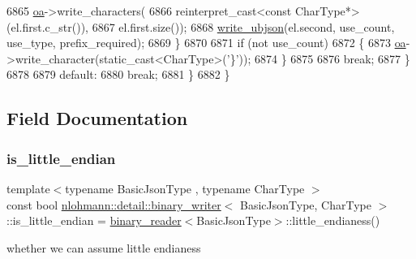 \begin{DoxyCode}
6865                     \hyperlink{classnlohmann_1_1detail_1_1binary__writer_a6f15b782a7900f50ef37d123008e601b}{oa}->write\_characters(
6866                         reinterpret\_cast<const CharType*>(el.first.c\_str()),
6867                         el.first.size());
6868                     \hyperlink{classnlohmann_1_1detail_1_1binary__writer_a0f6c65053d859269f88eb4ebb0cd7060}{write\_ubjson}(el.second, use\_count, use\_type, prefix\_required);
6869                 \}
6870 
6871                 \textcolor{keywordflow}{if} (not use\_count)
6872                 \{
6873                     \hyperlink{classnlohmann_1_1detail_1_1binary__writer_a6f15b782a7900f50ef37d123008e601b}{oa}->write\_character(static\_cast<CharType>(\textcolor{charliteral}{'\}'}));
6874                 \}
6875 
6876                 \textcolor{keywordflow}{break};
6877             \}
6878 
6879             \textcolor{keywordflow}{default}:
6880                 \textcolor{keywordflow}{break};
6881         \}
6882     \}
\end{DoxyCode}


\subsection{Field Documentation}
\mbox{\label{classnlohmann_1_1detail_1_1binary__writer_a048887c907afe39759b777e8c888414c}} 
\subsubsection{\texorpdfstring{is\+\_\+little\+\_\+endian}{is\_little\_endian}}
{\footnotesize\ttfamily template$<$typename Basic\+Json\+Type , typename Char\+Type $>$ \\
const bool \hyperlink{classnlohmann_1_1detail_1_1binary__writer}{nlohmann\+::detail\+::binary\+\_\+writer}$<$ Basic\+Json\+Type, Char\+Type $>$\+::is\+\_\+little\+\_\+endian = \hyperlink{classnlohmann_1_1detail_1_1binary__reader}{binary\+\_\+reader}$<$Basic\+Json\+Type$>$\+::little\+\_\+endianess()\hspace{0.3cm}{\ttfamily [private]}}



whether we can assume little endianess 



